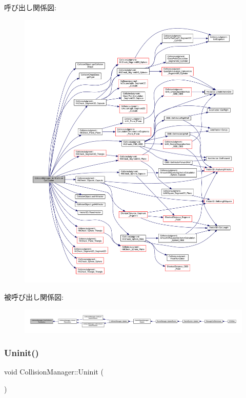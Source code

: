 呼び出し関係図\+:
\nopagebreak
\begin{figure}[H]
\begin{center}
\leavevmode
\includegraphics[width=350pt]{class_collision_manager_a87f64affda1906cd6eee3d177ca25045_cgraph}
\end{center}
\end{figure}
被呼び出し関係図\+:
\nopagebreak
\begin{figure}[H]
\begin{center}
\leavevmode
\includegraphics[width=350pt]{class_collision_manager_a87f64affda1906cd6eee3d177ca25045_icgraph}
\end{center}
\end{figure}
\mbox{\label{class_collision_manager_abfa4b87f3ce102f0d173e112e7963f09}} 
\subsubsection{\texorpdfstring{Uninit()}{Uninit()}}
{\footnotesize\ttfamily void Collision\+Manager\+::\+Uninit (\begin{DoxyParamCaption}{ }\end{DoxyParamCaption})}



